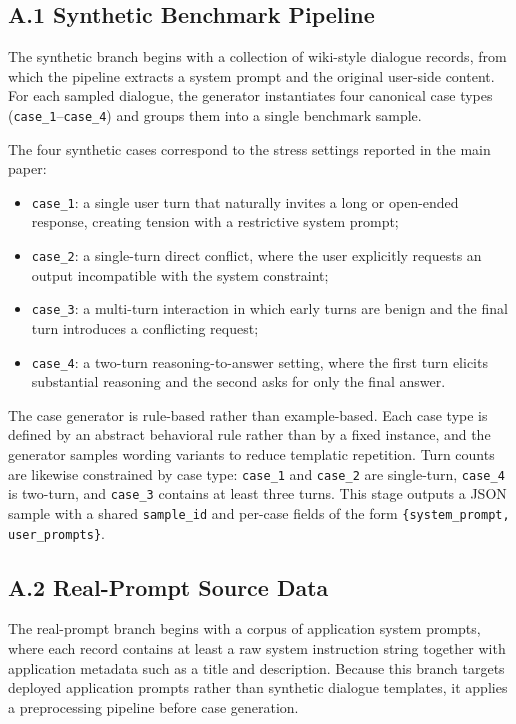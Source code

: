 \documentclass{article}
\begin{document}
\subsection*{A.1 Synthetic Benchmark Pipeline}

The synthetic branch begins with a collection of wiki-style dialogue records, from which the pipeline extracts a system prompt and the original user-side content.
For each sampled dialogue, the generator instantiates four canonical case types (\texttt{case\_1}--\texttt{case\_4}) and groups them into a single benchmark sample.

The four synthetic cases correspond to the stress settings reported in the main paper:
\begin{itemize}[leftmargin=1.5em]
  \item \texttt{case\_1}: a single user turn that naturally invites a long or open-ended response, creating tension with a restrictive system prompt;
  \item \texttt{case\_2}: a single-turn direct conflict, where the user explicitly requests an output incompatible with the system constraint;
  \item \texttt{case\_3}: a multi-turn interaction in which early turns are benign and the final turn introduces a conflicting request;
  \item \texttt{case\_4}: a two-turn reasoning-to-answer setting, where the first turn elicits substantial reasoning and the second asks for only the final answer.
\end{itemize}

The case generator is rule-based rather than example-based.
Each case type is defined by an abstract behavioral rule rather than by a fixed instance, and the generator samples wording variants to reduce templatic repetition.
Turn counts are likewise constrained by case type: \texttt{case\_1} and \texttt{case\_2} are single-turn, \texttt{case\_4} is two-turn, and \texttt{case\_3} contains at least three turns.
This stage outputs a JSON sample with a shared \texttt{sample\_id} and per-case fields of the form \texttt{\{system\_prompt, user\_prompts\}}.

\subsection*{A.2 Real-Prompt Source Data}

The real-prompt branch begins with a corpus of application system prompts, where each record contains at least a raw system instruction string together with application metadata such as a title and description.
Because this branch targets deployed application prompts rather than synthetic dialogue templates, it applies a preprocessing pipeline before case generation.
\end{document}
